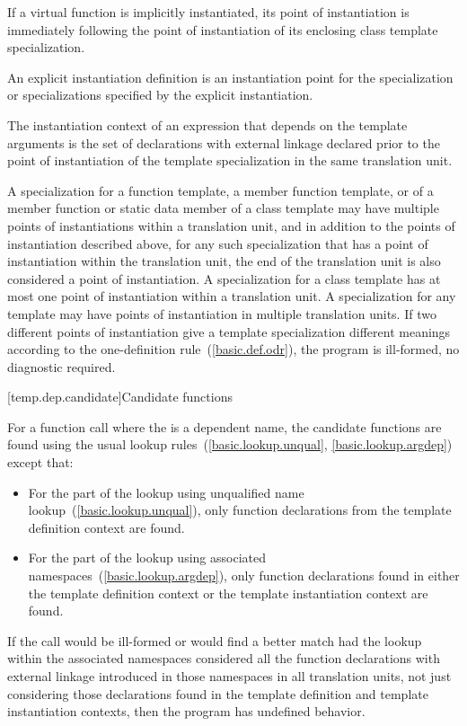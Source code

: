 \pnum
If a virtual function is implicitly instantiated, its point of instantiation
is immediately following the point of instantiation of its enclosing class
template specialization.

\pnum
An explicit instantiation definition is an instantiation
point for the specialization or specializations specified by the explicit
instantiation.

\pnum
The instantiation context of an expression that depends on the template
arguments is the set of declarations with external linkage declared prior to the
point of instantiation of the template specialization in the same translation
unit.

\pnum
A specialization for a function template, a member function template,
or of a member function or static data member of a class template may have
multiple points of instantiations within a translation unit, and in addition
to the points of instantiation described above, for any such specialization
that has a point of instantiation within the translation unit, the end of the
translation unit is also considered a point of instantiation.
A specialization for a class template has at most one point of instantiation
within a translation unit.
A specialization for any template may have points of instantiation in multiple
translation units.
If two different points of instantiation give a template specialization
different meanings according to the one-definition rule~(\ref{basic.def.odr}),
the program is ill-formed, no diagnostic required.

[temp.dep.candidate]{Candidate functions}

\pnum
{}%
For a function call where the  is a
dependent name,
the candidate functions are found using the usual lookup
rules~(\ref{basic.lookup.unqual}, \ref{basic.lookup.argdep}) except that:

\begin{itemize}
\item
For the part of the lookup using unqualified name lookup~(\ref{basic.lookup.unqual}),
only function declarations
from the template definition context are found.
\item
For the part of the lookup using associated namespaces~(\ref{basic.lookup.argdep}),
only function declarations found in either the template
definition context or the template instantiation context are found.
\end{itemize}

If
the call would be ill-formed or would find a better match had the lookup
within the associated namespaces considered all the function declarations with
external linkage introduced in those namespaces in all translation units,
not just considering those declarations found in the template definition and
template instantiation contexts, then the program has undefined behavior.

